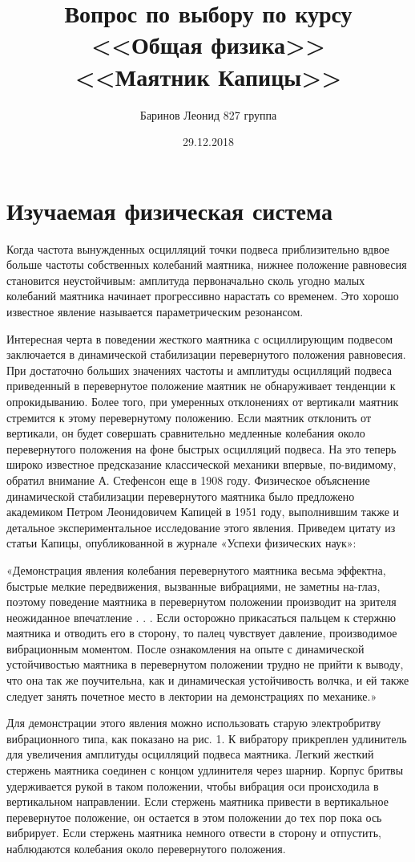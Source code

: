 \documentclass[a4paper,12pt]{article} %
\title{Вопрос по выбору по курсу \\ <<Общая физика>>  \\ 
\vspace{0.2cm}
\vspace{4.5cm}
 \LARGE{\textbf{<<Маятник Капицы>>}}\vspace{5.5cm}}
\date{29.12.2018}
\author{\vspace{0.2cm}Баринов Леонид 827 группа}
\begin{document}
\maketitle
\newpage
\section{Изучаемая физическая система}
Когда частота вынужденных осцилляций точки подвеса приблизительно вдвое больше частоты собственных колебаний маятника, нижнее положение равновесия становится неустойчивым: амплитуда первоначально сколь угодно малых колебаний маятника начинает прогрессивно нарастать со временем. Это хорошо известное явление называется параметрическим резонансом.

Интересная черта в поведении жесткого маятника с осциллирующим подвесом заключается в динамической стабилизации перевернутого положения равновесия. При достаточно больших значениях частоты и амплитуды осцилляций подвеса приведенный в перевернутое положение маятник не обнаруживает тенденции к опрокидыванию. Более того, при умеренных отклонениях от вертикали маятник стремится к этому перевернутому положению. Если маятник отклонить от вертикали, он будет совершать сравнительно медленные колебания около перевернутого положения на фоне быстрых осцилляций подвеса. На это теперь широко известное предсказание классической механики впервые, по-видимому, обратил внимание А. Стефенсон еще в 1908 году. Физическое объяснение динамической стабилизации перевернутого маятника было предложено академиком Петром Леонидовичем Капицей в 1951 году, выполнившим также и детальное экспериментальное исследование этого явления. Приведем цитату из статьи Капицы, опубликованной в журнале «Успехи физических наук»:

«Демонстрация явления колебания перевернутого маятника весьма эффектна, быстрые мелкие передвижения, вызванные вибрациями, не заметны на-глаз, поэтому поведение маятника в перевернутом положении производит на зрителя неожиданное впечатление . . . Если осторожно прикасаться пальцем к стержню маятника и отводить его в сторону, то палец чувствует давление, производимое вибрационным моментом. После ознакомления на опыте с динамической устойчивостью маятника в перевернутом положении трудно не прийти к выводу, что она так же поучительна, как и динамическая устойчивость волчка, и ей также следует занять почетное место в лектории на демонстрациях по механике.»

Для демонстрации этого явления можно использовать старую электробритву вибрационного типа, как показано на рис. 1. К вибратору прикреплен удлинитель для увеличения амплитуды осцилляций подвеса маятника. Легкий жесткий стержень маятника соединен с концом удлинителя через шарнир. Корпус бритвы удерживается рукой в таком положении, чтобы вибрация оси происходила в вертикальном направлении. Если стержень маятника привести в вертикальное перевернутое положение, он остается в этом положении до тех пор пока ось вибрирует. Если стержень маятника немного отвести в сторону и отпустить, наблюдаются колебания около перевернутого положения.
\end{document}
